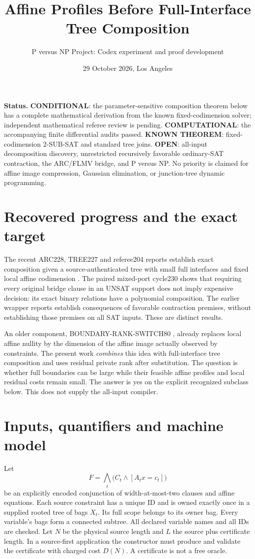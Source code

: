 \documentclass[11pt]{article}
\title{Affine Profiles Before Full-Interface Tree Composition}
\author{P versus NP Project: Codex experiment and proof development}
\date{29 October 2026, Los Angeles}
\begin{document}
\maketitle
\noindent\textbf{Status.} \textbf{CONDITIONAL}: the parameter-sensitive composition theorem below has a complete mathematical derivation from the known fixed-codimension solver; independent mathematical referee review is pending. \textbf{COMPUTATIONAL}: the accompanying finite differential audits passed. \textbf{KNOWN THEOREM}: fixed-codimension 2-SUB-SAT and standard tree joins. \textbf{OPEN}: all-input decomposition discovery, unrestricted recursively favorable ordinary-SAT contraction, the ARC/FLMV bridge, and P versus NP. No priority is claimed for affine image compression, Gaussian elimination, or junction-tree dynamic programming.

\section{Recovered progress and the exact target}
The recent ARC228, TREE227 and referee204 reports establish exact composition given a source-authenticated tree with small full interfaces and fixed local affine codimension \cite{ARC228,Tree227,Ref204}. The paired mixed-port cycle230 shows that requiring every original bridge clause in an UNSAT support does not imply expensive decision: its exact binary relations have a polynomial composition. The earlier wrapper reports establish consequences of favorable contraction premises, without establishing those premises on all SAT inputs. These are distinct results.

An older component, BOUNDARY-RANK-SWITCH80 \cite{Rank80}, already replaces local affine nullity by the dimension of the affine image actually observed by constraints. The present work \emph{combines} this idea with full-interface tree composition and uses residual private rank after substitution. The question is whether full boundaries can be large while their feasible affine profiles and local residual costs remain small. The answer is yes on the explicit recognized subclass below. This does not supply the all-input compiler.

\section{Inputs, quantifiers and machine model}
Let
\[
 F=\bigwedge_t\bigl(C_t\wedge[A_tx=c_t]\bigr)
\]
be an explicitly encoded conjunction of width-at-most-two clauses and affine equations. Each source constraint has a unique ID and is owned exactly once in a supplied rooted tree of bags $X_t$. Its full scope belongs to its owner bag. Every variable's bags form a connected subtree. All declared variable names and all IDs are checked. Let $N$ be the physical source length and $L$ the source plus certificate length. In a source-first application the constructor must produce and validate the certificate with charged cost $D(N)$. A certificate is not a free oracle.
\end{document}

